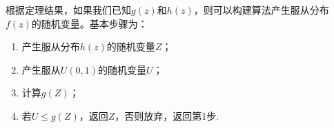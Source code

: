 

根据定理结果，如果我们已知$g(z)$和$h(z)$，则可以构建算法产生服从分布
$f(z)$的随机变量。基本步骤为：
\begin{enumerate}
\item 产生服从分布$h(z)$的随机变量$Z$；
\item 产生服从$U(0, 1)$的随机变量$U$；
\item 计算$g(Z)$；
\item 若$U \leq g(Z)$，返回$Z$，否则放弃，返回第1步.
\end{enumerate}

